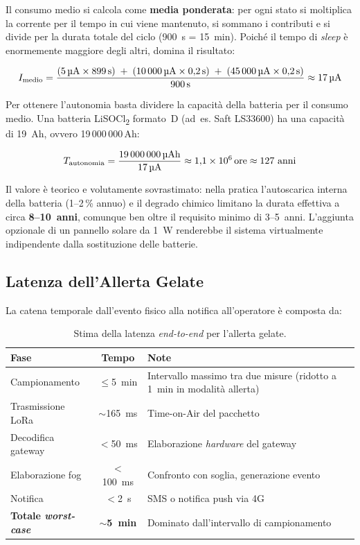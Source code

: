 \noindent Il consumo medio si calcola come \textbf{media ponderata}: per ogni stato si moltiplica la corrente per il tempo in cui viene mantenuto, si sommano i contributi e si divide per la durata totale del ciclo (900~s = 15~min). Poiché il tempo di \textit{sleep} è enormemente maggiore degli altri, domina il risultato:

\[
    I_{\text{medio}} = \frac{(5\,\text{\textmu A} \times 899\,\text{s}) \;+\; (10\,000\,\text{\textmu A} \times 0{,}2\,\text{s}) \;+\; (45\,000\,\text{\textmu A} \times 0{,}2\,\text{s})}{900\,\text{s}} \approx 17\,\text{\textmu A}
\]

\noindent Per ottenere l'autonomia basta dividere la capacità della batteria per il consumo medio. Una batteria LiSOCl\textsubscript{2} formato~D (ad~es. Saft LS33600) ha una capacità di 19~Ah, ovvero 19\,000\,000\,\textmu Ah:

\[
    T_{\text{autonomia}} = \frac{19\,000\,000\,\text{\textmu Ah}}{17\,\text{\textmu A}} \approx 1{,}1 \times 10^6 \text{\,ore} \approx 127~\text{anni}
\]

\noindent Il valore è teorico e volutamente sovrastimato: nella pratica l'autoscarica interna della batteria (1--2\,\% annuo) e il degrado chimico limitano la durata effettiva a circa \textbf{8--10~anni}, comunque ben oltre il requisito minimo di 3--5~anni. L'aggiunta opzionale di un pannello solare da 1~W renderebbe il sistema virtualmente indipendente dalla sostituzione delle batterie.

\subsection{Latenza dell'Allerta Gelate}

La catena temporale dall'evento fisico alla notifica all'operatore è composta da:

\begin{table}[H]
    \centering
    \small
    \begin{tabularx}{\textwidth}{|l|c|X|}
        \hline
        \textbf{Fase} & \textbf{Tempo} & \textbf{Note} \\
        \hline
        Campionamento & $\leq$5~min & Intervallo massimo tra due misure (ridotto a 1~min in modalità allerta) \\
        \hline
        Trasmissione LoRa & $\sim$165~ms & Time-on-Air del pacchetto \\
        \hline
        Decodifica gateway & $<$50~ms & Elaborazione \textit{hardware} del gateway \\
        \hline
        Elaborazione fog & $<$100~ms & Confronto con soglia, generazione evento \\
        \hline
        Notifica & $<$2~s & SMS o notifica push via 4G \\
        \hline
        \textbf{Totale \textit{worst-case}} & $\sim$\textbf{5~min} & Dominato dall'intervallo di campionamento \\
        \hline
    \end{tabularx}
    \caption{Stima della latenza \textit{end-to-end} per l'allerta gelate.}
    \label{tab:latenza_gelate}
\end{table}

